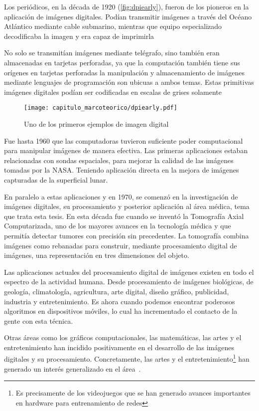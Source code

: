 Los periódicos, en la década de 1920 (\autoref{fig:dpiearly}), fueron de los
pioneros en la aplicación de imágenes digitales. Podían transmitir imágenes a
través del Océano Atlántico mediante cable submarino, mientras que equipo
especializado decodificaba la imagen y era capaz de imprimirla

No solo se transmitían imágenes mediante telégrafo, sino también eran
almacenadas en tarjetas perforadas, ya que la computación también tiene sus
orígenes en tarjetas perforadas la manipulación y almacenamiento de imágenes
mediante lenguajes de programación son ubicuas a ambos temas. Estas primitivas
imágenes digitales podían ser codificadas en escalas de grises solamente

\begin{figure}[H]
    \centering
    \texttt{[image: capitulo\_marcoteorico/dpiearly.pdf]}
    \caption{Uno de los primeros ejemplos de imagen digital}\label{fig:dpiearly}
\end{figure}

Fue hasta 1960 que las computadoras tuvieron suficiente poder computacional para
manipular imágenes de manera efectiva. Las primeras aplicaciones estaban
relacionadas con sondas espaciales, para mejorar la calidad de las imágenes
tomadas por la NASA. Teniendo aplicación directa en la mejora de imágenes
capturadas de la superficial lunar.

En paralelo a estas aplicaciones y en 1970, se comenzó en la investigación de
imágenes digitales, su procesamiento y posterior aplicación al área médica, tema
que trata esta tesis. En esta década fue cuando se inventó la Tomografía Axial
Computarizada, uno de los mayores avances en la tecnología médica y que permitía
detectar tumores con precisión sin precedentes. La tomografía combina imágenes
como rebanadas para construir, mediante procesamiento digital de imágenes, una
representación en tres dimensiones del objeto.

Las aplicaciones actuales del procesamiento digital de imágenes existen en todo
el espectro de la actividad humana. Desde procesamiento de imágenes biológicas,
de geología, climatología, agricultura, arte digital, diseño gráfico,
publicidad, industria y entretenimiento. Es ahora cuando podemos encontrar
poderosos algoritmos en dispositivos móviles, lo cual ha incrementado el
contacto de la gente con esta técnica.

Otras áreas como los gráficos computacionales, las matemáticas, las artes y el
entretenimiento han incidido positivamente en el desarrollo de las imágenes
digitales y su procesamiento. Concretamente, las artes y el
entretenimiento\footnote{Es precisamente de los videojuegos que se han generado
avances importantes en hardware para entrenamiento de redes} han generado un
interés generalizado en el área~\cite{Gonzalez2001}.

